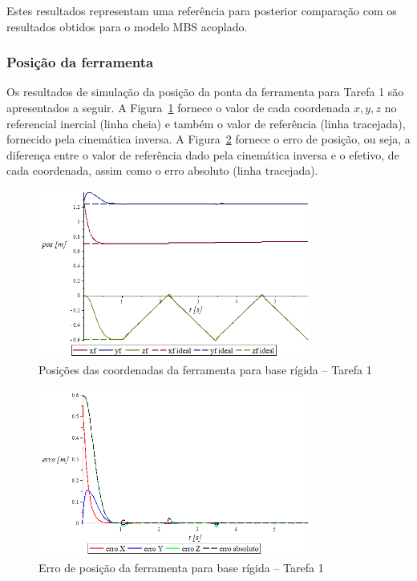 Estes resultados representam uma referência para posterior comparação com os
resultados obtidos para o modelo MBS acoplado.

\subsubsection{Posição da ferramenta}

Os resultados de simulação da posição da ponta da ferramenta para Tarefa 1 são
apresentados a seguir. A Figura~\ref{fig::t1_posf_base_rig} fornece o valor de
cada coordenada $x, y, z$ no referencial inercial (linha cheia) e também o valor
de referência (linha tracejada), fornecido pela cinemática inversa. A
Figura~\ref{fig::t1_erroposf_base_rig} fornece o erro de posição, ou seja, a
diferença entre o valor de referência dado pela cinemática inversa e o efetivo,
de cada coordenada, assim como o erro absoluto (linha tracejada).

\begin{figure}[h!]
	\centering 
 	\includegraphics[width=0.80\textwidth]{figs/t1_posf_base_rig}
 	\caption{Posições das coordenadas da ferramenta para base rígida -- Tarefa 1}
 	\label{fig::t1_posf_base_rig}
\end{figure}

\begin{figure}[h!]
	\centering 
 	\includegraphics[width=0.80\textwidth]{figs/t1_erroposf_base_rig}
 	\caption{Erro de posição da ferramenta para base rígida -- Tarefa 1}
 	\label{fig::t1_erroposf_base_rig}
\end{figure}


